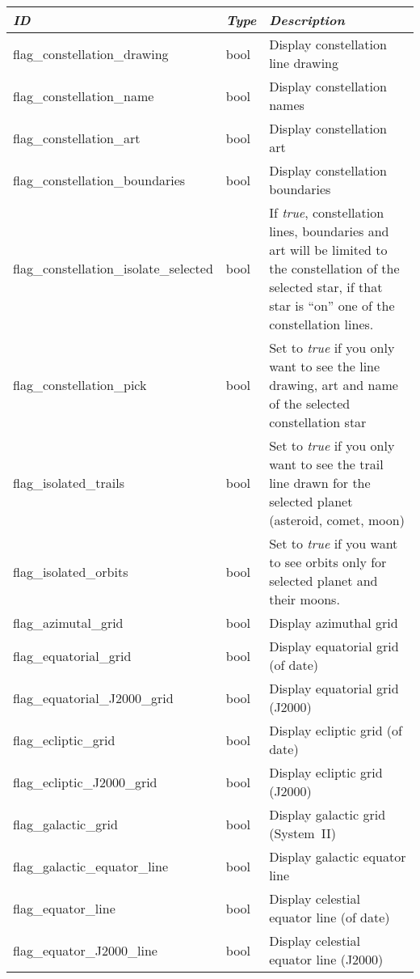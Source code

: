 \begin{longtabu} to \textwidth {l|l|X}
\toprule
\emph{ID} & \emph{Type} & \emph{Description}\\\midrule
flag\_constellation\_drawing    & bool  & Display constellation line drawing\\\midrule
flag\_constellation\_name       & bool  & Display constellation names\\\midrule
flag\_constellation\_art        & bool  & Display constellation art\\\midrule
flag\_constellation\_boundaries & bool  & Display constellation boundaries \\\midrule
flag\_constellation\_isolate\_selected  & bool & If \emph{true}, constellation lines, boundaries and art will be limited to the constellation of the selected star, 
                                                 if that star is ``on'' one of the constellation lines.\\\midrule
flag\_constellation\_pick     & bool & Set to \emph{true} if you only want to see the line drawing, art and name of the selected constellation star\\\midrule
flag\_isolated\_trails        & bool & Set to \emph{true} if you only want to see the trail line drawn for the selected planet (asteroid, comet, moon)\\\midrule
flag\_isolated\_orbits        & bool & Set to \emph{true} if you want to see orbits only for selected planet and their moons.\\\midrule
flag\_azimutal\_grid          & bool & Display azimuthal grid \\\midrule
flag\_equatorial\_grid        & bool & Display equatorial grid (of date) \\\midrule
flag\_equatorial\_J2000\_grid & bool & Display equatorial grid (J2000) \\\midrule
flag\_ecliptic\_grid          & bool & Display ecliptic grid (of date) \\\midrule
flag\_ecliptic\_J2000\_grid   & bool & Display ecliptic grid (J2000) \\\midrule
flag\_galactic\_grid          & bool & Display galactic grid (System~II)\\\midrule
flag\_galactic\_equator\_line & bool & Display galactic equator line \\\midrule
flag\_equator\_line           & bool & Display celestial equator line (of date) \\\midrule
flag\_equator\_J2000\_line    & bool & Display celestial equator line (J2000) \\\midrule

\end{longtabu}
